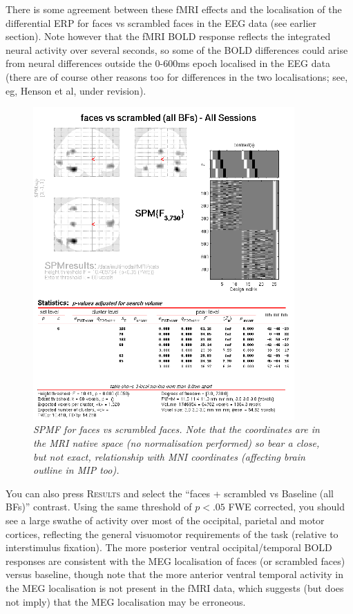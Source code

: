 There is some agreement between these fMRI effects and the localisation of the differential ERP for faces vs scrambled faces in the EEG data (see earlier section). Note however that the fMRI BOLD response reflects the integrated neural activity over several seconds, so some of the BOLD differences could arise from neural differences outside the 0-600ms epoch localised in the EEG data (there are of course other reasons too for differences in the two localisations; see, eg, Henson et al, under revision).

\begin{figure}
\begin{center}
\includegraphics[width=100mm]{multimodal/figures/fmri_faces_vs_scrambled}
\caption{\em  SPM{F} for faces vs scrambled faces. Note that the coordinates are in the MRI native space (no normalisation performed) so bear a close, but not exact, relationship with MNI coordinates (affecting brain outline in MIP too).\label{multimodal:fig:22}}
\end{center}
\end{figure}

You can also press \textsc{Results} and select the ``faces + scrambled vs Baseline (all BFs)'' contrast. Using the same threshold of $p<.05$ FWE corrected, you should see a large swathe of activity over most of the occipital, parietal and motor cortices, reflecting the general visuomotor requirements of the task (relative to interstimulus fixation). The more posterior ventral occipital/temporal BOLD responses are consistent with the MEG localisation of faces (or scrambled faces) versus baseline, though note that the more anterior ventral temporal activity in the MEG localisation is not present in the fMRI data, which suggests (but does not imply) that the MEG localisation may be erroneous.

